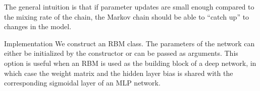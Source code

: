 \documentclass[12pt]{article}
\begin{document}
The general intuition is that if parameter updates are small enough compared to the mixing rate of the chain, the Markov chain should be able to “catch up” to changes in the model.

Implementation
We construct an RBM class. The parameters of the network can either be initialized by the constructor or can be passed as arguments. This option is useful when an RBM is used as the building block of a deep network, in which case the weight matrix and the hidden layer bias is shared with the corresponding sigmoidal layer of an MLP network.
\end{document}
